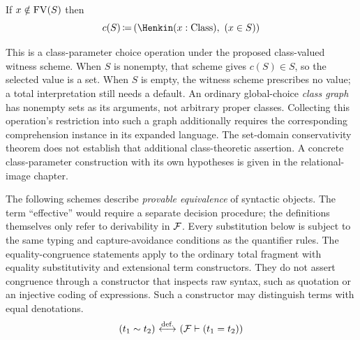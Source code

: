 \iffalse %
\begin{axiom}[Henkin axiom schema]%
\labeltagd{axm}{Henkin}

\[
(\exists y.\varphi)
\implies
(\varphi[h_{(y.\varphi)}/y])
\labeltagd{axm}{H1}
\]

\[
\FV(c_{(y.\varphi)}):=\FV((y.\varphi))
\]
Semantics: if the assumption is true, then $c_{(y.\varphi)}$ is one of such objects $y$, that $\varphi$ holds(in our case classes are objects);  if the assumption is not true, then $c_{(y.\varphi)}$ is interpreted as some default class. The empty class is chosen to be default. Note, that the implementation of the interpretation of this symbol may require meta-theoretical choice on the domain (i.e. on the conglomerate of all classes) as well, or something like that.
\end{axiom}
\fi %
\begin{definition}%
If $x\notin \mathrm{FV}(S)$ then
\[
c(S)\ceq (\Henkin (x:\Class),\ (x\in S))
\]
\end{definition}
This is a class-parameter choice operation under the proposed
class-valued witness scheme. When $S$ is nonempty, that scheme gives
$c(S)\in S$, so the selected value is a set. When $S$ is empty, the
witness scheme prescribes no value; a total interpretation still needs
a default. An ordinary global-choice \emph{class graph} has nonempty
sets as its arguments, not arbitrary proper classes. Collecting this
operation's restriction into such a graph additionally requires the
corresponding comprehension instance in its expanded language. The
set-domain conservativity theorem does not establish that additional
class-theoretic assertion. A concrete class-parameter construction with
its own hypotheses is given in the relational-image chapter.

The following schemes describe \textit{provable equivalence} of syntactic
objects. The term ``effective'' would require a separate decision procedure;
the definitions themselves only refer to derivability in ${\mathcal{F}}$. Every
substitution below is subject to the same typing and capture-avoidance
conditions as the quantifier rules.
The equality-congruence statements apply to the ordinary total fragment
with equality substitutivity and extensional term constructors. They do
not assert congruence through a constructor that inspects raw syntax,
such as quotation or an injective coding of expressions. Such a
constructor may distinguish terms with equal denotations.
\[
(t_1 \sim t_2)
\ {\stackrel{{\textrm{def.}}}{\longleftrightarrow}}\ 
({\mathcal{F}}\vdash (t_1=t_2))
\]

